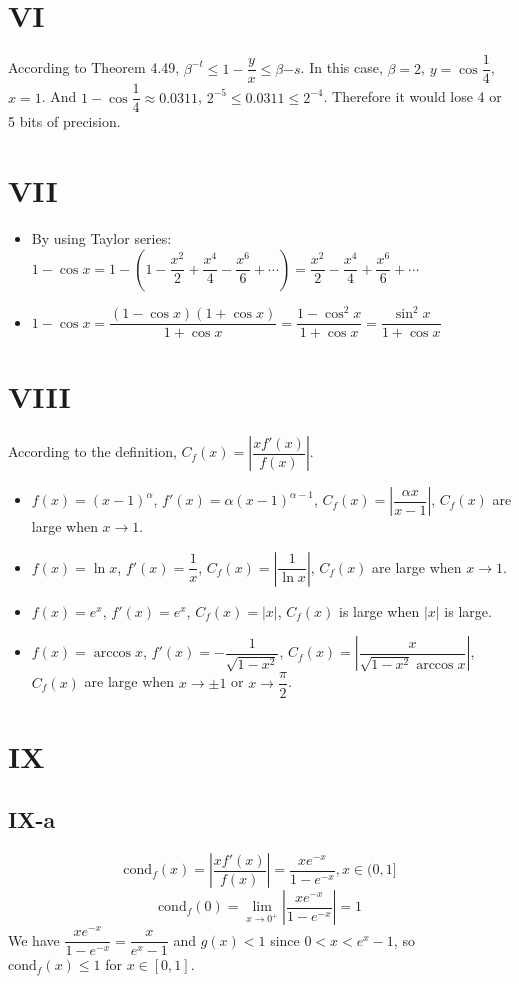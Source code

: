 \documentclass[a4paper]{article}
\begin{document}
\section*{VI}
According to Theorem 4.49, $\beta^{-t}\leq 1 - \dfrac{y}{x} \leq \beta{-s}$. In this case, $\beta = 2$, $y = \cos{\dfrac{1}{4}}$, $x=1$. And $1-\cos{\dfrac{1}{4}} \approx 0.0311$, $2^{-5}\leq0.0311\leq2^{-4}$.
Therefore it would lose 4 or 5 bits of precision.

\section*{VII}
\begin{itemize}
  \item By using Taylor series: $1-\cos{x}=1-(1-\dfrac{x^2}{2}+\dfrac{x^4}{4}-\dfrac{x^6}{6}+\cdots)=\dfrac{x^2}{2}-\dfrac{x^4}{4}+\dfrac{x^6}{6}+\cdots$
  \item $1-\cos{x} = \dfrac{(1-\cos{x})(1+\cos{x})}{1+\cos{x}} = \dfrac{1-\cos^2{x}}{1+\cos{x}} = \dfrac{\sin^2{x}}{1+\cos{x}}$
\end{itemize}

\section*{VIII}
According to the definition, $C_{f}(x) = |\dfrac{xf'(x)}{f(x)}|$.
\begin{itemize}
  \item $f(x) = (x-1)^\alpha$, $f'(x) = \alpha(x-1)^{\alpha-1}$, $C_{f}(x) = |\dfrac{\alpha x}{x-1}|$, $C_{f}(x)$ are large when $x \rightarrow 1$.
  \item $f(x) = \ln x$, $f'(x) = \dfrac{1}{x}$, $C_{f}(x) = |\dfrac{1}{\ln x}|$, $C_{f}(x)$ are large when $x \rightarrow 1$.
  \item $f(x) = e^x$, $f'(x) = e^x$, $C_{f}(x) = |x|$, $C_{f}(x)$ is large when $|x|$ is large.
  \item $f(x) = \arccos x$, $f'(x) = -\dfrac{1}{\sqrt{1-x^2}}$, $C_{f}(x) = |\dfrac{x}{\sqrt{1-x^2}\arccos x}|$, $C_{f}(x)$ are large when $x \rightarrow \pm 1$ or $x \rightarrow \dfrac{\pi}{2}$.
\end{itemize}
\section*{IX}
\subsection*{IX-a}
$$
\text{cond}_f(x) = |\frac{xf'(x)}{f(x)}| = \frac{xe^{-x}}{1-e^{-x}}, x \in (0,1]
$$
$$
\text{cond}_f(0) = \lim_{x\rightarrow0^{+}}|\frac{xe^{-x}}{1-e^{-x}}| = 1
$$
We have $\dfrac{xe^{-x}}{1-e^{-x}} = \dfrac{x}{e^x-1}$ and $g(x) < 1$ since $0 < x < e^x -1$, so $\text{cond}_f(x) \leq 1$ for $x \in [0,1]$.
\end{document}
